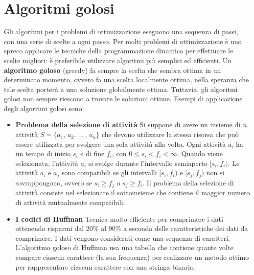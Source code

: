 \documentclass[10pt, a4paper]{report}
\begin{document}
\chapter{Algoritmi golosi}
Gli algoritmi per i problemi di ottimizzazione eseguono una sequenza di passi, con una serie di scelte a ogni passo. Per molti problemi di ottimizzazione è uno spreco applicare le tecniche della programmazione dinamica per effettuare le scelte migliori: è preferibile utilizzare algoritmi più semplici ed efficienti. Un \textbf{algoritmo goloso} (greedy) fa sempre la scelta che sembra ottima in un determinato momento, ovvero fa una scelta localmente ottima, nella speranza che tale scelta porterà a una soluzione globalmente ottima. Tuttavia, gli algoritmi golosi non sempre riescono a trovare le soluzioni ottime. Esempi di applicazione degli algoritmi golosi sono:
\begin{itemize}
\item \textbf{Problema della selezione di attività} Si suppone di avere un insieme di \textit{n} attività $S = \{a_1,\,a_2,\,...\,,\,a_n\}$ che devono utilizzare la stessa risorsa che può essere utilizzata per svolgere una sola attività alla volta. Ogni attività $a_i$ ha un tempo di inizio $s_i$ e di fine $f_i$, con $0 \leq s_i < f_i < \infty$. Quando viene selezionata, l'attività $a_i$ si svolge durante l'intervallo semiaperto $[s_i,f_i)$. Le attività $a_i$ e $a_j$ sono compatibili se gli intervalli $[s_i,f_i)$ e $[s_j,f_j)$ non si sovrappongono, ovvero se $s_i \geq f_j$ o $s_j \geq f_i$. Il problema della selezione di attività consiste nel selezionare il sottoinsieme che contiene il maggior numero di attività mutualmente compatibili.
\item \textbf{I codici di Huffman} Tecnica molto efficiente per comprimere i dati ottenendo risparmi dal 20\% al 90\% a seconda delle caratteristiche dei dati da comprimere. I dati vengono considerati come una sequenza di caratteri. L'algoritmo goloso di Huffman usa una tabella che contiene quante volte compare ciascun carattere (la sua frequenza) per realizzare un metodo ottimo per rappresentare ciascun carattere con una stringa binaria.

\end{itemize}
\end{document}
